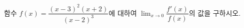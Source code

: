 함수 $f(x)=\dfrac{(x-3)^2(x+2)}{(x-2)^3}$에 대하여 $\displaystyle\lim_{x\to 0}\dfrac{f'(x)}{f(x)}$의 값을 구하시오.
